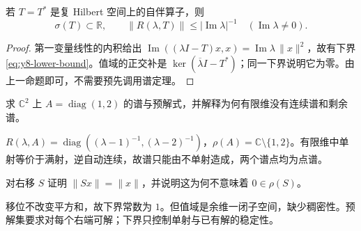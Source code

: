 \begin{proposition}[自伴算子的非实预解式]\label{prop:y8-self-adjoint-resolvent}
若 $T=T^*$ 是复 Hilbert 空间上的自伴算子，则
\[
 \sigma(T)\subset\mathbb R,\qquad
 \|R(\lambda,T)\|\le |\operatorname{Im}\lambda|^{-1}\quad(\operatorname{Im}\lambda\ne0).
\]
\end{proposition}
\begin{proof}
第一变量线性的内积给出 $\operatorname{Im}((\lambda I-T)x,x)=\operatorname{Im}\lambda\,\|x\|^2$，故有下界 \eqref{eq:y8-lower-bound}。值域的正交补是 $\ker(\overline\lambda I-T^*)$；同一下界说明它为零。由上一命题即可，不需要预先调用谱定理。
\end{proof}

\begin{exercise}[谱的三种失效方式]\label{ex:y8-spectrum-types}
求 $\mathbb C^2$ 上 $A=\operatorname{diag}(1,2)$ 的谱与预解式，并解释为何有限维没有连续谱和剩余谱。
\end{exercise}
\begin{solution}
$R(\lambda,A)=\operatorname{diag}((\lambda-1)^{-1},(\lambda-2)^{-1})$，$\rho(A)=\mathbb C\setminus\{1,2\}$。有限维中单射等价于满射，逆自动连续，故谱只能由不单射造成，两个谱点均为点谱。
\end{solution}

\begin{exercise}[下界不保证满射]\label{ex:y8-shift-bound}
对右移 $S$ 证明 $\|Sx\|=\|x\|$，并说明这为何不意味着 $0\in\rho(S)$。
\end{exercise}
\begin{solution}
移位不改变平方和，故下界常数为 $1$。但值域是余维一闭子空间，缺少稠密性。预解集要求对每个右端可解；下界只控制单射与已有解的稳定性。
\end{solution}
